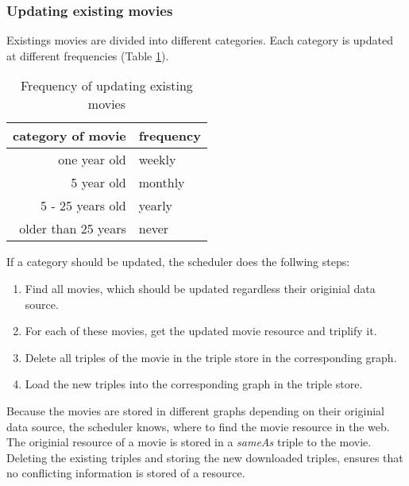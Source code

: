 
\subsubsection{Updating existing movies}
Existings movies are divided into different categories.
Each category is updated at different frequencies (Table \ref{tab_updating_existing}).
\begin{table}[h]
	\caption{Frequency of updating existing movies}
	\begin{center}
	\begin{tabular}{rl}
		\textbf{category of movie} & \textbf{frequency} \\ \hline
		one year old & weekly \\
		5 year old & monthly \\
		5 - 25 years old & yearly \\
		older than 25 years & never \\
	\end{tabular}
	\end{center}
	\label{tab_updating_existing}
\end{table}
If a category should be updated, the scheduler does the follwing steps:
\begin{enumerate}
	\item Find all movies, which should be updated regardless their originial data source.
	\item For each of these movies, get the updated movie resource and triplify it.
	\item Delete all triples of the movie in the triple store in the corresponding graph.
	\item Load the new triples into the corresponding graph in the triple store.
\end{enumerate}
Because the movies are stored in different graphs depending on their originial data source, the scheduler knows, where to find the movie resource in the web.
The originial resource of a movie is stored in a \emph{sameAs} triple to the movie.
Deleting the existing triples and storing the new downloaded triples, ensures that no conflicting information is stored of a resource.